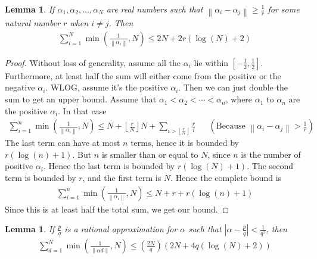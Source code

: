 \documentclass[12pt]{article}
\newtheorem{lem}[thm]{Lemma}
\theoremstyle{definition}
\newcommand{\norm}[1]{\left\lVert#1\right\rVert}
\begin{document}
\begin{lem} \label{lem:2}
    If $\alpha_1, \alpha_2, \ldots, \alpha_N$ are real numbers such that $\norm{\alpha_i - \alpha_j} \geq \frac{1}{r}$ for some natural number $r$ when $i \neq j$. Then
    \begin{align*}
        \sum_{i=1}^{N} \min\left( \frac{1}{\norm{\alpha_i}}, N \right) \leq 2N + 2r(\log(N) + 2)
    \end{align*} 
\end{lem}

\begin{proof}
    Without loss of generality, assume all the $\alpha_i$ lie within $\left[ -\frac{1}{2}, \frac{1}{2} \right]$. Furthermore, at least half the sum will either come from the positive or the negative $\alpha_i$. WLOG, assume it's the positive $\alpha_i$. Then we can just double the sum to get an upper bound. Assume that $\alpha_1 < \alpha_2 < \cdots < \alpha_n$, where $\alpha_1$ to $\alpha_n$ are the positive $\alpha_i$. In that case
    \begin{align*}
        \sum_{i=1}^{n}\min\left( \frac{1}{\norm{\alpha_i}}, N  \right) \leq N+ \left\lfloor \frac{r}{N} \right\rfloor N + \sum_{i > \left\lfloor \frac{r}{N} \right\rfloor} \frac{r}{i} &&\left(\text{Because $\norm{\alpha_i -\alpha_j} > \frac{1}{r}$}\right)
    \end{align*}
    The last term can have at most $n$ terms, hence it is bounded by $r (\log(n) + 1)$. But $n$ is smaller than or equal to $N$, since $n$ is the number of positive $\alpha_i$. Hence the last term is bounded by $r(\log(N) + 1)$. The second term is bounded by $r$, and the first term is $N$. Hence the complete bound is
    \begin{align*}
        \sum_{i=1}^{n}\min\left( \frac{1}{\norm{\alpha_i}}, N  \right) \leq N + r + r(\log(n) + 1)
    \end{align*}
    Since this is at least half the total sum, we get our bound.
\end{proof}

\begin{lem}
    If $\frac{p}{q}$ is a rational approximation for $\alpha$ such that $\left| \alpha - \frac{p}{q} \right| < \frac{1}{q^2}$, then
    \begin{align*}
        \sum_{d=1}^{N} \min\left( \frac{1}{\norm{\alpha d}}, N \right) \leq \left( \frac{2N}{q}\right) \left( 2N +4q(\log(N) +2) \right)
    \end{align*}
\end{lem}
\end{document}
